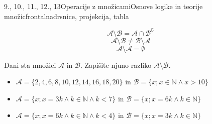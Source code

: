\begin{priprava}{9., 10., 11., 12., 13}{}{Operacije z množicami}{Osnove logike in teorije množic}{frontalna}{drsnice, projekcija, tabla}
\begin{figure}[H]
\begin{subfigure}[b]{0.4\textwidth}
        \end{subfigure}
        \begin{subfigure}[b]{0.4\textwidth}
            \centering
        \end{subfigure}
    \end{figure}



            $$ \mathcal{A}\setminus\mathcal{B}=\mathcal{A}\cap\mathcal{B}^\complement$$
            $$ \mathcal{A}\setminus\mathcal{B}\neq\mathcal{B}\setminus\mathcal{A}$$
            $$ \mathcal{A}\setminus\mathcal{A}=\emptyset$$


            \begin{naloga}
                Dani sta množici $\mathcal{A}$ in $\mathcal{B}$. Zapišite njuno razliko $\mathcal{A}\setminus\mathcal{B}$.
                \begin{itemize}
                    \item $\mathcal{A}=\{2,4,6,8,10,12,14,16,18,20\}$ in $\mathcal{B}=\{x; x\in\mathbb{N} \land x>10\}$
                    \item $\mathcal{A}=\{x; x=3k \land k\in\mathbb{N} \land k<7\}$ in $\mathcal{B}=\{x; x=6k \land k\in\mathbb{N}\}$
                    \item $\mathcal{A}=\{x; x=6k \land k\in\mathbb{N} \land k<4\}$ in $\mathcal{B}=\{x; x=3k \land k\in\mathbb{N}\}$
                \end{itemize}
            \end{naloga}




\end{priprava}
